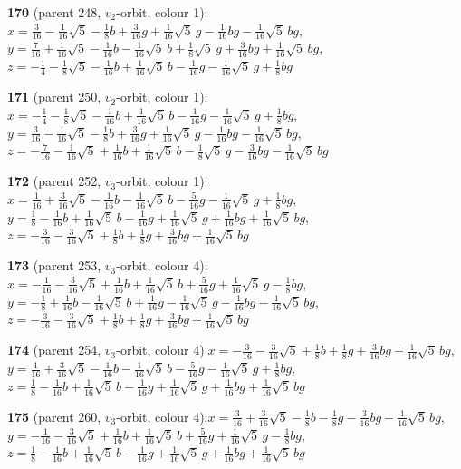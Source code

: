 \documentclass[10pt]{article}
\begin{document}
{\noindent\textbf{170} (parent 248, $v_2$-orbit, colour 1):\quad $x=\tfrac{3}{16}-\tfrac{1}{16}\sqrt5-\tfrac{1}{8}b+\tfrac{3}{16}g+\tfrac{1}{16}\sqrt5\,g-\tfrac{1}{16}bg-\tfrac{1}{16}\sqrt5\,bg$,\quad $y=\tfrac{7}{16}+\tfrac{1}{16}\sqrt5-\tfrac{1}{16}b-\tfrac{1}{16}\sqrt5\,b+\tfrac{1}{8}\sqrt5\,g+\tfrac{3}{16}bg+\tfrac{1}{16}\sqrt5\,bg$,\quad $z=-\tfrac{1}{4}-\tfrac{1}{8}\sqrt5-\tfrac{1}{16}b+\tfrac{1}{16}\sqrt5\,b-\tfrac{1}{16}g-\tfrac{1}{16}\sqrt5\,g+\tfrac{1}{8}bg$\par\smallskip
\noindent\textbf{171} (parent 250, $v_2$-orbit, colour 1):\quad $x=-\tfrac{1}{4}-\tfrac{1}{8}\sqrt5-\tfrac{1}{16}b+\tfrac{1}{16}\sqrt5\,b-\tfrac{1}{16}g-\tfrac{1}{16}\sqrt5\,g+\tfrac{1}{8}bg$,\quad $y=\tfrac{3}{16}-\tfrac{1}{16}\sqrt5-\tfrac{1}{8}b+\tfrac{3}{16}g+\tfrac{1}{16}\sqrt5\,g-\tfrac{1}{16}bg-\tfrac{1}{16}\sqrt5\,bg$,\quad $z=-\tfrac{7}{16}-\tfrac{1}{16}\sqrt5+\tfrac{1}{16}b+\tfrac{1}{16}\sqrt5\,b-\tfrac{1}{8}\sqrt5\,g-\tfrac{3}{16}bg-\tfrac{1}{16}\sqrt5\,bg$\par\smallskip
\noindent\textbf{172} (parent 252, $v_3$-orbit, colour 1):\quad $x=\tfrac{1}{16}+\tfrac{3}{16}\sqrt5-\tfrac{1}{16}b-\tfrac{1}{16}\sqrt5\,b-\tfrac{5}{16}g-\tfrac{1}{16}\sqrt5\,g+\tfrac{1}{8}bg$,\quad $y=\tfrac{1}{8}-\tfrac{1}{16}b+\tfrac{1}{16}\sqrt5\,b-\tfrac{1}{16}g+\tfrac{1}{16}\sqrt5\,g+\tfrac{1}{16}bg+\tfrac{1}{16}\sqrt5\,bg$,\quad $z=-\tfrac{3}{16}-\tfrac{3}{16}\sqrt5+\tfrac{1}{8}b+\tfrac{1}{8}g+\tfrac{3}{16}bg+\tfrac{1}{16}\sqrt5\,bg$\par\smallskip
\noindent\textbf{173} (parent 253, $v_3$-orbit, colour 4):\quad $x=-\tfrac{1}{16}-\tfrac{3}{16}\sqrt5+\tfrac{1}{16}b+\tfrac{1}{16}\sqrt5\,b+\tfrac{5}{16}g+\tfrac{1}{16}\sqrt5\,g-\tfrac{1}{8}bg$,\quad $y=-\tfrac{1}{8}+\tfrac{1}{16}b-\tfrac{1}{16}\sqrt5\,b+\tfrac{1}{16}g-\tfrac{1}{16}\sqrt5\,g-\tfrac{1}{16}bg-\tfrac{1}{16}\sqrt5\,bg$,\quad $z=-\tfrac{3}{16}-\tfrac{3}{16}\sqrt5+\tfrac{1}{8}b+\tfrac{1}{8}g+\tfrac{3}{16}bg+\tfrac{1}{16}\sqrt5\,bg$\par\smallskip
\noindent\textbf{174} (parent 254, $v_3$-orbit, colour 4):\quad $x=-\tfrac{3}{16}-\tfrac{3}{16}\sqrt5+\tfrac{1}{8}b+\tfrac{1}{8}g+\tfrac{3}{16}bg+\tfrac{1}{16}\sqrt5\,bg$,\quad $y=\tfrac{1}{16}+\tfrac{3}{16}\sqrt5-\tfrac{1}{16}b-\tfrac{1}{16}\sqrt5\,b-\tfrac{5}{16}g-\tfrac{1}{16}\sqrt5\,g+\tfrac{1}{8}bg$,\quad $z=\tfrac{1}{8}-\tfrac{1}{16}b+\tfrac{1}{16}\sqrt5\,b-\tfrac{1}{16}g+\tfrac{1}{16}\sqrt5\,g+\tfrac{1}{16}bg+\tfrac{1}{16}\sqrt5\,bg$\par\smallskip
\noindent\textbf{175} (parent 260, $v_3$-orbit, colour 4):\quad $x=\tfrac{3}{16}+\tfrac{3}{16}\sqrt5-\tfrac{1}{8}b-\tfrac{1}{8}g-\tfrac{3}{16}bg-\tfrac{1}{16}\sqrt5\,bg$,\quad $y=-\tfrac{1}{16}-\tfrac{3}{16}\sqrt5+\tfrac{1}{16}b+\tfrac{1}{16}\sqrt5\,b+\tfrac{5}{16}g+\tfrac{1}{16}\sqrt5\,g-\tfrac{1}{8}bg$,\quad $z=\tfrac{1}{8}-\tfrac{1}{16}b+\tfrac{1}{16}\sqrt5\,b-\tfrac{1}{16}g+\tfrac{1}{16}\sqrt5\,g+\tfrac{1}{16}bg+\tfrac{1}{16}\sqrt5\,bg$\par\smallskip
}
\end{document}
